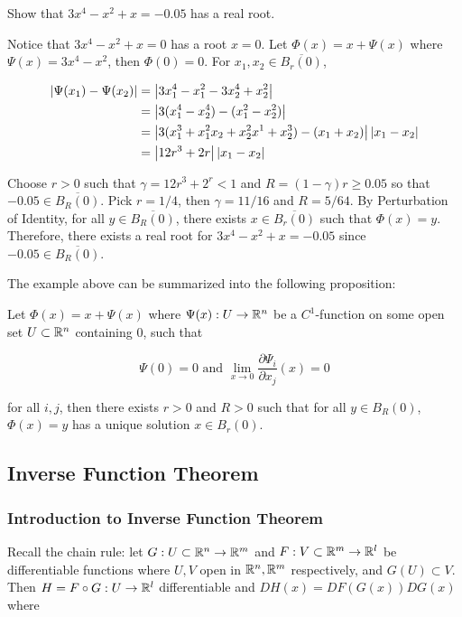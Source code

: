 \documentclass[a4paper,12pt]{article}
\begin{document}
\begin{exm}
  Show that $3x^{4}-x^{2}+x=-0.05$ has a real root.\n

  \prf Notice that $3x^{4}-x^{2}+x=0$ has a root $x=0$. Let $\Phi(x)=x+\Psi(x)$ where $\Psi(x)=3x^{4}-x^{2}$, then $\Phi(0)=0$. For $x_{1},x_{2}\in\overline{B_{r}(0)}$,

  $$\begin{aligned}[t]
    \left| \Psi(x_{1})-\Psi(x_{2})\right|&=\left| 3x_{1}^{4}-x_{1}^{2}-3x_{2}^{4}+x_{2}^{2}\right|\\
    &=\left| 3(x_{1}^{4}-x_{2}^{4})-(x_{1}^{2}-x_{2}^{2})\right|\\
    &=\left| 3(x_{1}^{3}+x_{1}^{2}x_{2}+x_{2}^{2}x^{1}+x_{2}^{3})-(x_{1}+x_{2})\right|\left| x_{1}-x_{2}\right|\\
    &=\left| 12r^{3}+2r\right|\left| x_{1}-x_{2}\right|
  \end{aligned}$$\s

  Choose $r>0$ such that $\gamma=12r^{3}+2^{r}<1$ and $R=(1-\gamma)r\geq 0.05$ so that $-0.05\in\overline{B_{R}(0)}$. Pick $r=1/4$, then $\gamma=11/16$ and $R=5/64$. By Perturbation of Identity, for all $y\in\overline{B_{R}(0)}$, there exists $x\in\overline{B_{r}(0)}$ such that $\Phi(x)=y$. Therefore, there exists a real root for $3x^{4}-x^{2}+x=-0.05$ since $-0.05\in\overline{B_{R}(0)}$.
\end{exm}\n

The example above can be summarized into the following proposition:\n

\begin{pst}
  Let $\Phi(x)=x+\Psi(x)$ where $\Psi(x):U\to\mathbb{R}^{n}$ be a $C^{1}$-function on some open set $U\subset\mathbb{R}^{n}$ containing $0$, such that

  $$\Psi(0)=0\text{ and }\lim_{x\to 0}\frac{\partial\Psi_{i}}{\partial x_{j}}(x)=0$$\s

  for all $i,j$, then there exists $r>0$ and $R>0$ such that for all $y\in B_{R}(0)$, $\Phi(x)=y$ has a unique solution $x\in B_{r}(0)$.
\end{pst}

\subsection{Inverse Function Theorem}
\subsubsection{Introduction to Inverse Function Theorem}
Recall the chain rule: let $G:U\subset\mathbb{R}^{n}\to\mathbb{R}^{m}$ and $F:V\subset\mathbb{R}^{m}\to\mathbb{R}^{l}$ be differentiable functions where $U,V$ open in $\mathbb{R}^{n},\mathbb{R}^{m}$ respectively, and $G(U)\subset V$. Then $H=F\circ G:U\to\mathbb{R}^{l}$ differentiable and $DH(x)=DF(G(x))DG(x)$ where
\end{document}
